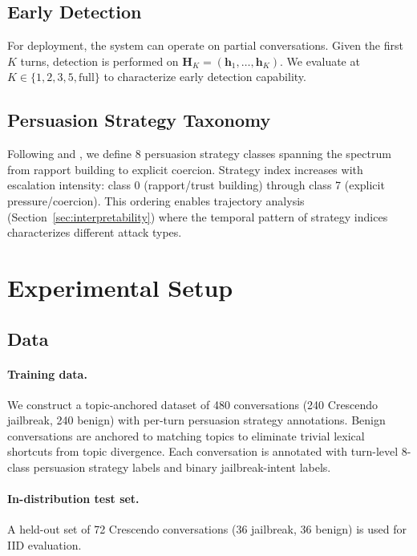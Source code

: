 \documentclass[11pt,a4paper]{article}
\begin{document}
\subsection{Early Detection}
For deployment, the system can operate on partial conversations.
Given the first $K$ turns, detection is performed on $\mathbf{H}_K = (\mathbf{h}_1, \ldots, \mathbf{h}_K)$.
We evaluate at $K \in \{1, 2, 3, 5, \text{full}\}$ to characterize early detection capability.

\subsection{Persuasion Strategy Taxonomy}
\label{sec:taxonomy}
Following \citet{zeng2024pap} and \citet{hagendorff2026}, we define 8 persuasion strategy classes spanning the spectrum from rapport building to explicit coercion.
Strategy index increases with escalation intensity: class 0 (rapport/trust building) through class 7 (explicit pressure/coercion).
This ordering enables trajectory analysis (Section~\ref{sec:interpretability}) where the temporal pattern of strategy indices characterizes different attack types.

\section{Experimental Setup}

\subsection{Data}
\paragraph{Training data.}
We construct a topic-anchored dataset of 480 conversations (240 Crescendo jailbreak, 240 benign) with per-turn persuasion strategy annotations.
Benign conversations are anchored to matching topics to eliminate trivial lexical shortcuts from topic divergence.
Each conversation is annotated with turn-level 8-class persuasion strategy labels and binary jailbreak-intent labels.

\paragraph{In-distribution test set.}
A held-out set of 72 Crescendo conversations (36 jailbreak, 36 benign) is used for IID evaluation.
\end{document}
